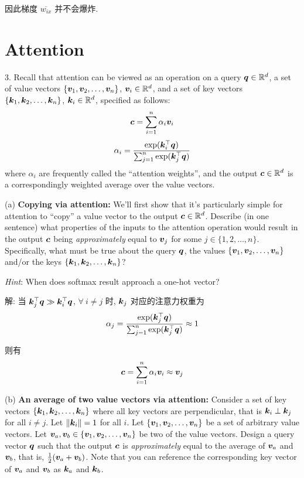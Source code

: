 \documentclass{article}
\begin{document}
因此梯度 $\overline{w_{ix}}$ 并不会爆炸.

\section*{Attention}

3. Recall that attention can be viewed as an operation on a query $\bm{q}\in\mathbb{R}^{d}$, a set of value vectors $\{\bm{v}_{1},\bm{v}_2, \dots, \bm{v}_{n}\}$, $\bm{v}_{i} \in \mathbb{R}^{d}$, and a set of key vectors $\{\bm{k}_{1},\bm{k}_2,\dots, \bm{k}_{n}\}$, $\bm{k}_{i} \in \mathbb{R}^{d}$, specified as follows:
\begin{equation}
   \bm{c}=\sum_{i=1}^{n} \alpha_{i}\bm{v}_{i} 
\end{equation} 
\begin{equation}
  \alpha_{i}
  =\frac{\exp(\bm{k}_{i}^{\top}\bm{q})}{\sum_{j=1}^{n}\exp(\bm{k}_{j}^{\top}\bm{q})}
\end{equation}
where $\alpha_i$ are frequently called the ``attention weights'', and the output $\bm{c} \in \mathbb{R}^{d}$ is a correspondingly weighted average over the value vectors.

(a) \textbf{Copying via attention:} We'll first show that it's particularly simple for attention to ``copy'' a value vector to the output $\bm{c}\in\mathbb{R}^{d} $. Describe (in one sentence) what properties of the inputs to the attention operation would result in the output $\bm{c}$ being \emph{approximately} equal to $\bm{v}_j$ for some $j \in\{1,2, \dots, n\}$. Specifically, what must be true about the query $\bm{q}$, the values $\{\bm{v}_{1},\bm{v}_2, \dots, \bm{v}_{n}\}$ and/or the keys $\{\bm{k}_{1},\bm{k}_2,\dots, \bm{k}_{n}\}$?

\emph{Hint}: When does softmax result approach a one-hot vector?

解: 当 $\bm{k}_j^\top\bm{q}\gg\bm{k}_i^\top\bm{q}$, $\forall~i\neq j$ 时, $\bm{k}_j$ 对应的注意力权重为
\begin{equation}
  \alpha_j
  =\frac{\exp(\bm{k}_{j}^{\top}\bm{q})}{\sum_{j=1}^{n}\exp(\bm{k}_{j}^{\top}\bm{q})}
  \approx1
\end{equation} 

则有
\begin{equation}
  \bm{c}
  =\sum_{i=1}^{n}\alpha_{i}\bm{v}_{i}
  \approx\bm{v}_j
\end{equation}

(b) \textbf{An average of two value vectors via attention:} Consider a set of key vectors $\{\bm{k}_{1},\bm{k}_2,\dots, \bm{k}_{n}\}$ where all key vectors are perpendicular, that is $\bm{k}_{i} \perp \bm{k}_{j}$ for all  $i \neq j$. Let $\|\bm{k}_{i}\|=1$ for all $i$. Let $\{\bm{v}_{1},\bm{v}_2, \dots, \bm{v}_{n}\}$  be a set of arbitrary value vectors. Let $\bm{v}_a, \bm{v}_b \in \{\bm{v}_{1},\bm{v}_2, \dots, \bm{v}_{n}\}$ be two of the value vectors. Design a query vector $\bm{q}$ such that the output $\bm{c}$ is \emph{approximately} equal to the average of $\bm{v}_a$ and $\bm{v}_b$, that is, $\frac{1}{2}(\bm{v}_{a}+\bm{v}_{b})$. Note that you can reference the corresponding key vector of $\bm{v}_a$ and $\bm{v}_b$ as $\bm{k}_a$ and $\bm{k}_b$.
\end{document}

